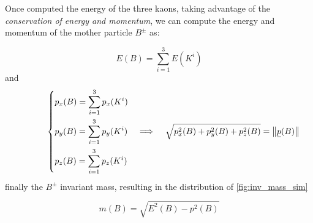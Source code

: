 \begin{figure}[H]
	\centering
	\caption{} %
\end{figure}

Once computed the energy of the three kaons, taking advantage of the \emph{conservation of energy and momentum}, we can compute the energy and momentum of the mother particle $B^{\pm}$ as:

\begin{equation}
    E(B) = \sum_{i=1}^{3} E(K^{i})
\end{equation}
and
\begin{equation}
\hspace{1.2cm}
    \begin{dcases}
        p_x(B) = \sum_{i=1}^{3} p_x(K^{i}) \\
        p_y(B) = \sum_{i=1}^{3} p_y(K^{i}) \hspace{0.4cm}
        \Longrightarrow \hspace{0.4cm}
        \sqrt{ p_{x}^2(B) + p_{y}^2(B) + p_{z}^2(B) } = \norm {\underline{p}(B)} \\
        p_z(B) = \sum_{i=1}^{3} p_z(K^{i})
    \end{dcases}
\end{equation}
finally the $B^{\pm}$ invariant mass, resulting in the distribution of \autoref{fig:inv_mass_sim}

\begin{equation}
    m(B) = \sqrt{E^2(B)-p^2(B)}
\end{equation}

